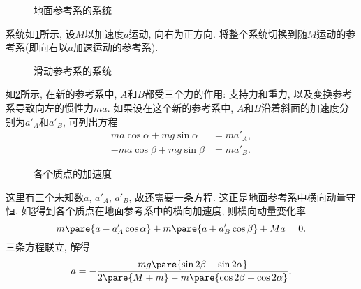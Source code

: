 \documentclass{ctexart}
\begin{document}
\begin{figure}[ht]
    \centering
    \caption{地面参考系的系统}
    \label{fig:地面参考系的系统}
\end{figure}
系统如\cref{fig:地面参考系的系统}所示, 设$M$以加速度$a$运动, 向右为正方向. 将整个系统切换到随$M$运动的参考系(即向右以$a$加速运动的参考系).
\begin{figure}[ht]
    \centering
    \caption{滑动参考系的系统}
    \label{fig:滑动参考系的系统}
\end{figure}
\par
如\cref{fig:滑动参考系的系统}所示, 在新的参考系中, $A$和$B$都受三个力的作用: 支持力和重力, 以及变换参考系导致向左的惯性力$ma$. 如果设在这个新的参考系中, $A$和$B$沿着斜面的加速度分别为$a'_A$和$a'_B$, 可列出方程
\begin{align*}
    ma\cos\alpha + mg\sin\alpha &= ma'_A,\\
    -ma\cos\beta + mg\sin \beta &= ma'_B.
\end{align*}
\begin{figure}[ht]
    \centering
    \caption{各个质点的加速度}
    \label{fig:各个质点的加速度}
\end{figure}%
这里有三个未知数$a$, $a'_A$, $a'_B$, 故还需要一条方程. 这正是地面参考系中横向动量守恒. 如\cref{fig:各个质点的加速度}得到各个质点在地面参考系中的横向加速度, 则横向动量变化率
\[ m\pare{a - a'_A\cos\alpha} + m\pare{a+a'_B\cos\beta} + Ma = 0. \]
三条方程联立, 解得
\[ a= -\frac{mg\pare{\sin 2\beta - \sin 2\alpha}}{2\pare{M+m} - m\pare{\cos 2\beta + \cos 2\alpha}}. \]
\end{document}
